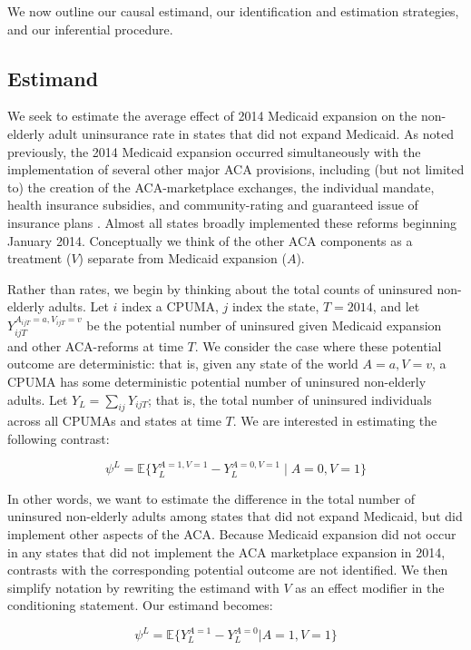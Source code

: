 \documentclass[12pt]{article}
\begin{document}
We now outline our causal estimand, our identification and estimation strategies, and our inferential procedure.

\subsection{Estimand}

We seek to estimate the average effect of 2014 Medicaid expansion on the non-elderly adult uninsurance rate in states that did not expand Medicaid. As noted previously, the 2014 Medicaid expansion occurred simultaneously with the implementation of several other major ACA provisions, including (but not limited to) the creation of the ACA-marketplace exchanges, the individual mandate, health insurance subsidies, and community-rating and guaranteed issue of insurance plans \cite{courtemanche2017early}. Almost all states broadly implemented these reforms beginning January 2014. Conceptually we think of the other ACA components as a treatment ($V$) separate from Medicaid expansion ($A$).

Rather than rates, we begin by thinking about the total counts of uninsured non-elderly adults. Let $i$ index a CPUMA, $j$ index the state, $T = 2014$, and let $Y_{ijT}^{A_{ijT} = a, V_{ijT} = v}$ be the potential number of uninsured given Medicaid expansion and other ACA-reforms at time $T$. We consider the case where these potential outcome are deterministic: that is, given any state of the world $A = a, V = v$, a CPUMA has some deterministic potential number of uninsured non-elderly adults. Let $Y_L = \sum_{ij} Y_{ijT}$; that is, the total number of uninsured individuals across all CPUMAs and states at time $T$. We are interested in estimating the following contrast:

$$
\psi^L = \mathbb{E}\{Y_L^{A = 1, V = 1} - Y_L^{A = 0, V = 1} \mid A = 0, V = 1\}
$$

In other words, we want to estimate the difference in the total number of uninsured non-elderly adults among states that did not expand Medicaid, but did implement other aspects of the ACA. Because Medicaid expansion did not occur in any states that did not implement the ACA marketplace expansion in 2014, contrasts with the corresponding potential outcome are not identified. We then simplify notation by rewriting the estimand with $V$ as an effect modifier in the conditioning statement. Our estimand becomes:

$$
\psi^L = \mathbb{E}\{Y_L^{A = 1} - Y_L^{A = 0} | A = 1, V = 1\}
$$
\end{document}
